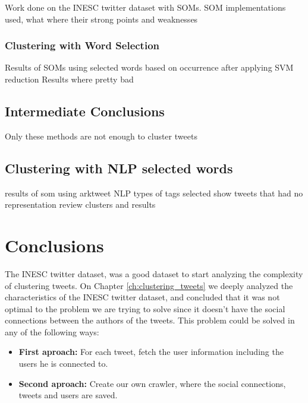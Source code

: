 Work done on the INESC twitter dataset with SOMs.
SOM implementations used, what where their strong points and weaknesses

\subsubsection{Clustering with Word Selection }
\label{ssub:Word Selection for Clustering}
{\color{red} Results of SOMs using selected words based on occurrence after applying SVM reduction }
{\color{red} Results where pretty bad }

\subsection{Intermediate Conclusions}
\label{sub:intermediate_conclusions}
{\color{red} Only these methods are not enough to cluster tweets }

\subsection{Clustering with NLP selected words}
\label{sub:clustering_with_nlp_selected_words}
{\color{red} results of som using arktweet NLP }
{\color{red} types of tags selected }
{\color{red} show tweets that had no representation }
{\color{red} review clusters and results }


\section{Conclusions}
\label{sec:conclusions}


\label{chap:crawling_twitter}
The INESC twitter dataset, was a good dataset to start analyzing the complexity of clustering tweets. On Chapter \ref{ch:clustering_tweets} we deeply analyzed the characteristics of the INESC twitter dataset, and concluded that it was not optimal to the problem we are trying to solve since it doesn't have the social connections between the authors of the tweets. This problem could be solved in any of the following ways:
\begin{itemize}
  \item \textbf{First aproach: } For each tweet, fetch the user information including the users he is connected to.
  \item \textbf{Second aproach: } Create our own crawler, where the social connections, tweets and users are saved.
\end{itemize}

